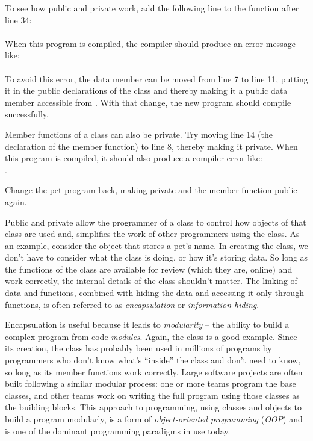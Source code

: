 To see how public and private work, add the following line to the  function after line 34:\\
\\
When this program is compiled, the compiler should produce an error message like:\\
\\
To avoid this error, the  data member can be moved from line 7 to line 11, putting it in the public declarations of the  class and thereby making it a public data member accessible from .  With that change, the new program should compile successfully.  

Member functions of a class can also be private.  Try moving line 14 (the declaration of the  member function)  to line 8, thereby making it private.  When this program is compiled, it should also produce a compiler error like:\\
.

Change the pet program back, making  private and the  member function public again.

Public and private allow the programmer of a class to control how objects of that class are used and, simplifies the work of other programmers using the class.  As an example, consider the  object that stores a pet's name.  In creating the  class, we don't have to consider what the  class is doing, or how it's storing data.  So long as the functions of the class are available for review (which they are, online) and work correctly, the internal details of the class shouldn't matter.  The linking of data and functions, combined with hiding the data and accessing it only through functions, is often referred to as \emph{encapsulation} or \emph{information hiding}.  

Encapsulation is useful because it leads to \emph{modularity} -- the ability to build a complex program from code \emph{modules}.  Again, the  class is a good example.  Since its creation, the  class has probably been used in millions of programs by programmers who don't know what's ``inside'' the class and don't need to know, so long as its member functions work correctly.  Large software projects are often built following a similar modular process: one or more teams program the base classes, and other teams work on writing the full program using those classes as the building blocks.   
This approach to programming, using classes and objects to build a program modularly, is a form of \emph{object-oriented programming} (\emph{OOP}) and is one of the dominant programming paradigms in use today.

